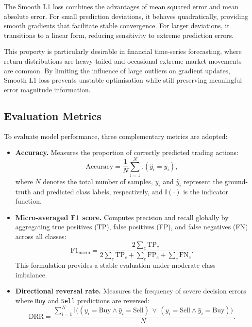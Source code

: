 \documentclass[10pt]{article} %
\begin{document}
The Smooth L1 loss combines the advantages of mean squared error and mean absolute error. 
For small prediction deviations, it behaves quadratically, providing smooth gradients that facilitate stable convergence. 
For larger deviations, it transitions to a linear form, reducing sensitivity to extreme prediction errors.

This property is particularly desirable in financial time-series forecasting, where return distributions are heavy-tailed and occasional extreme market movements are common. 
By limiting the influence of large outliers on gradient updates, Smooth L1 loss prevents unstable optimisation while still preserving meaningful error magnitude information.

\subsection{Evaluation Metrics}

To evaluate model performance, three complementary metrics are adopted:

\begin{itemize}
    \item \textbf{Accuracy.} 
    Measures the proportion of correctly predicted trading actions:
    \begin{equation}
        \text{Accuracy} = \frac{1}{N} \sum_{i=1}^{N} \mathbb{I}(\hat{y}_i = y_i),
    \end{equation}
    where $N$ denotes the total number of samples, $y_i$ and $\hat{y}_i$ represent the ground-truth and predicted class labels, respectively, and $\mathbb{I}(\cdot)$ is the indicator function.

    \item \textbf{Micro-averaged F1 score.} 
    Computes precision and recall globally by aggregating true positives (TP), false positives (FP), and false negatives (FN) across all classes:
    \begin{equation}
        \text{F1}_{\text{micro}} =
        \frac{2 \sum_{c} \text{TP}_c}
        {2 \sum_{c} \text{TP}_c + \sum_{c} \text{FP}_c + \sum_{c} \text{FN}_c}.
    \end{equation}
    This formulation provides a stable evaluation under moderate class imbalance.

    \item \textbf{Directional reversal rate.} 
    Measures the frequency of severe decision errors where \texttt{Buy} and \texttt{Sell} predictions are reversed:
    \begin{equation}
        \text{DRR} =
        \frac{
        \sum_{i=1}^{N} \mathbb{I}\big(
        (y_i = \text{Buy} \wedge \hat{y}_i = \text{Sell}) \,\vee\,
        (y_i = \text{Sell} \wedge \hat{y}_i = \text{Buy})
        \big)
        }{N}.
    \end{equation}
\end{itemize}
\end{document}
